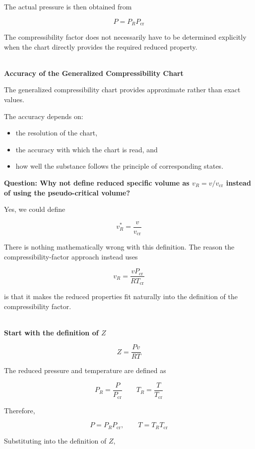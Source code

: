 \documentclass[12pt]{article}
\begin{document}
The actual pressure is then obtained from

\begin{equation*}
\boxed{
P=P_RP_{\mathrm{cr}}
}
\end{equation*}

The compressibility factor does not necessarily have to be determined explicitly when the chart directly provides the required reduced property.

\textbf{\\ Accuracy of the Generalized Compressibility Chart}

The generalized compressibility chart provides approximate rather than exact values.

The accuracy depends on:
\begin{itemize}
    \item the resolution of the chart,
    \item the accuracy with which the chart is read, and
    \item how well the substance follows the principle of corresponding states.
\end{itemize}

\newpage

\textbf{Question: Why not define reduced specific volume as $v_R=v/v_{\mathrm{cr}}$ instead of using the pseudo-critical volume?}

Yes, we could define

\[
\boxed{v_R^*=\frac{v}{v_{\mathrm{cr}}}}
\]

There is nothing mathematically wrong with this definition. The reason the compressibility-factor approach instead uses

\[
\boxed{
v_R=\frac{vP_{\mathrm{cr}}}{RT_{\mathrm{cr}}}
}
\]

is that it makes the reduced properties fit naturally into the definition of the compressibility factor.

\textbf{\\ Start with the definition of $Z$}

\[
\boxed{
Z=\frac{Pv}{RT}
}
\]

The reduced pressure and temperature are defined as

\[
\boxed{
P_R=\frac{P}{P_{\mathrm{cr}}}
}
\qquad
\boxed{
T_R=\frac{T}{T_{\mathrm{cr}}}
}
\]

Therefore,

\[
P=P_RP_{\mathrm{cr}},
\qquad
T=T_RT_{\mathrm{cr}}
\]

Substituting into the definition of $Z$,
\end{document}

